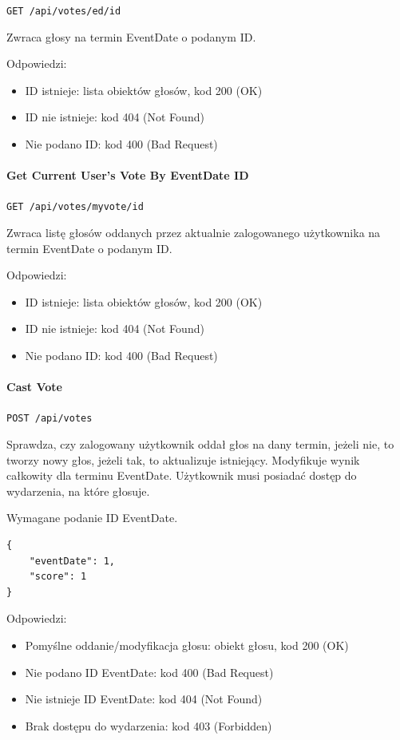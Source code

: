\documentclass[a4paper,twoside,12pt]{book}
\begin{document}
\texttt{GET /api/votes/ed/{id}}

Zwraca głosy na termin EventDate o podanym ID.

Odpowiedzi: 
\begin{itemize}
	\item ID istnieje: lista obiektów głosów, kod 200 (OK) 
	\item ID nie istnieje: kod 404 (Not Found) 
	\item Nie podano ID: kod 400 (Bad Request)
\end{itemize}

\paragraph{Get Current User's Vote By EventDate ID}

\texttt{GET /api/votes/myvote/{id}}

Zwraca listę głosów oddanych przez aktualnie zalogowanego użytkownika na termin EventDate o podanym ID.

Odpowiedzi: 
\begin{itemize}
	\item ID istnieje: lista obiektów głosów, kod 200 (OK) 
	\item ID nie istnieje: kod 404 (Not Found) 
	\item Nie podano ID: kod 400 (Bad Request)
\end{itemize}

\paragraph{Cast Vote}

\texttt{POST /api/votes}

Sprawdza, czy zalogowany użytkownik oddał głos na dany termin, jeżeli nie, to tworzy nowy głos, jeżeli tak, to aktualizuje istniejący. Modyfikuje wynik całkowity dla terminu EventDate. Użytkownik musi posiadać dostęp do wydarzenia, na które głosuje.

Wymagane podanie ID EventDate.

\begin{verbatim}
{
    "eventDate": 1,
    "score": 1
}
\end{verbatim}

Odpowiedzi: 
\begin{itemize}
	\item Pomyślne oddanie/modyfikacja głosu: obiekt głosu, kod 200 (OK) 
	\item Nie podano ID EventDate: kod 400 (Bad Request) 
	\item Nie istnieje ID EventDate: kod 404 (Not Found)
	\item Brak dostępu do wydarzenia: kod 403 (Forbidden)
\end{itemize}
\end{document}
